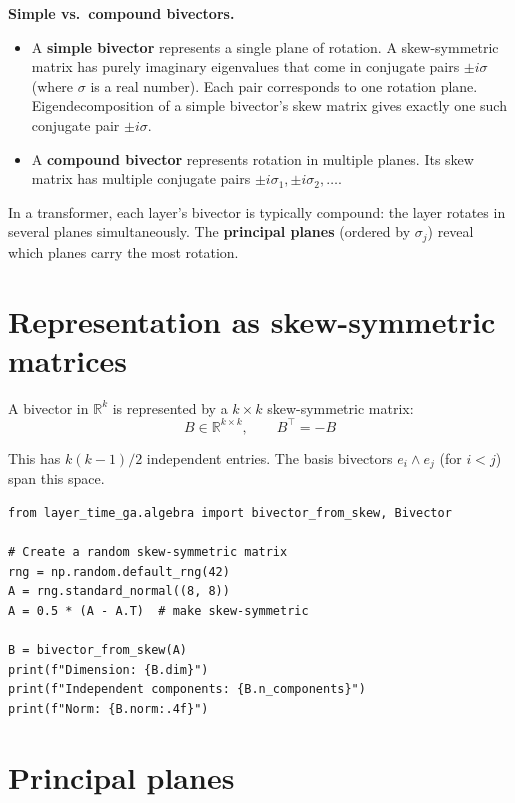 \documentclass[11pt, twoside, openright]{memoir}
\newcommand{\op}{\wedge}          %
\begin{document}
\begin{gabox}
\textbf{Simple vs.\ compound bivectors.}

\begin{itemize}[nosep]
\item A \textbf{simple bivector} represents a single plane of rotation.
  A skew-symmetric matrix has purely imaginary eigenvalues that come in
  conjugate pairs $\pm i\sigma$ (where $\sigma$ is a real number).  Each
  pair corresponds to one rotation plane.  Eigendecomposition of a simple
  bivector's skew matrix gives exactly one such conjugate pair
  $\pm i\sigma$.
\item A \textbf{compound bivector} represents rotation in multiple planes.
  Its skew matrix has multiple conjugate pairs
  $\pm i\sigma_1, \pm i\sigma_2, \ldots$.
\end{itemize}
In a transformer, each layer's bivector is typically compound: the layer
rotates in several planes simultaneously.  The \textbf{principal planes}
(ordered by $\sigma_j$) reveal which planes carry the most rotation.
\end{gabox}

\section{Representation as skew-symmetric matrices}

A bivector in $\mathbb{R}^k$ is represented by a $k \times k$
skew-symmetric matrix:
\[
  B \in \mathbb{R}^{k \times k}, \qquad B^\top = -B
\]

This has $k(k-1)/2$ independent entries.  The basis bivectors
$e_i \op e_j$ (for $i < j$) span this space.

\begin{lstlisting}[caption={Creating and inspecting a bivector}]
from layer_time_ga.algebra import bivector_from_skew, Bivector

# Create a random skew-symmetric matrix
rng = np.random.default_rng(42)
A = rng.standard_normal((8, 8))
A = 0.5 * (A - A.T)  # make skew-symmetric

B = bivector_from_skew(A)
print(f"Dimension: {B.dim}")
print(f"Independent components: {B.n_components}")
print(f"Norm: {B.norm:.4f}")
\end{lstlisting}

\section{Principal planes}
\end{document}
